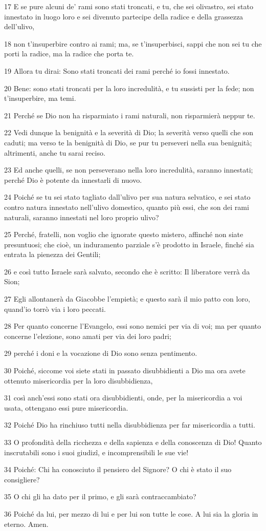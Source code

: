 \par 17 E se pure alcuni de' rami sono stati troncati, e tu, che sei olivastro, sei stato innestato in luogo loro e sei divenuto partecipe della radice e della grassezza dell'ulivo,
\par 18 non t'insuperbire contro ai rami; ma, se t'insuperbisci, sappi che non sei tu che porti la radice, ma la radice che porta te.
\par 19 Allora tu dirai: Sono stati troncati dei rami perché io fossi innestato.
\par 20 Bene: sono stati troncati per la loro incredulità, e tu sussisti per la fede; non t'insuperbire, ma temi.
\par 21 Perché se Dio non ha risparmiato i rami naturali, non risparmierà neppur te.
\par 22 Vedi dunque la benignità e la severità di Dio; la severità verso quelli che son caduti; ma verso te la benignità di Dio, se pur tu perseveri nella sua benignità; altrimenti, anche tu sarai reciso.
\par 23 Ed anche quelli, se non perseverano nella loro incredulità, saranno innestati; perché Dio è potente da innestarli di nuovo.
\par 24 Poiché se tu sei stato tagliato dall'ulivo per sua natura selvatico, e sei stato contro natura innestato nell'ulivo domestico, quanto più essi, che son dei rami naturali, saranno innestati nel loro proprio ulivo?
\par 25 Perché, fratelli, non voglio che ignorate questo mistero, affinché non siate presuntuosi; che cioè, un induramento parziale s'è prodotto in Israele, finché sia entrata la pienezza dei Gentili;
\par 26 e così tutto Israele sarà salvato, secondo che è scritto: Il liberatore verrà da Sion;
\par 27 Egli allontanerà da Giacobbe l'empietà; e questo sarà il mio patto con loro, quand'io torrò via i loro peccati.
\par 28 Per quanto concerne l'Evangelo, essi sono nemici per via di voi; ma per quanto concerne l'elezione, sono amati per via dei loro padri;
\par 29 perché i doni e la vocazione di Dio sono senza pentimento.
\par 30 Poiché, siccome voi siete stati in passato disubbidienti a Dio ma ora avete ottenuto misericordia per la loro disubbidienza,
\par 31 così anch'essi sono stati ora disubbidienti, onde, per la misericordia a voi usata, ottengano essi pure misericordia.
\par 32 Poiché Dio ha rinchiuso tutti nella disubbidienza per far misericordia a tutti.
\par 33 O profondità della ricchezza e della sapienza e della conoscenza di Dio! Quanto inscrutabili sono i suoi giudizî, e incomprensibili le sue vie!
\par 34 Poiché: Chi ha conosciuto il pensiero del Signore? O chi è stato il suo consigliere?
\par 35 O chi gli ha dato per il primo, e gli sarà contraccambiato?
\par 36 Poiché da lui, per mezzo di lui e per lui son tutte le cose. A lui sia la gloria in eterno. Amen.

